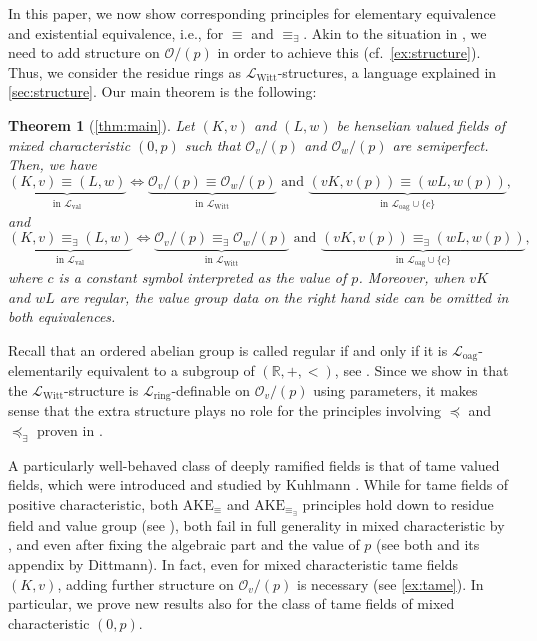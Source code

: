 \documentclass[a4paper]{amsart}
\theoremstyle{mystyle2}
\newtheorem*{thm*}{Theorem}
\theoremstyle{mystyle}
\renewcommand{\L}{\mathcal{L}}
\newcommand{\Lring}{\L_{\mathrm{ring}}}
\newcommand{\Loag}{\L_{\mathrm{oag}}}
\renewcommand{\O}{\mathcal{O}}
\numberwithin{equation}{section}
\begin{document}
    
    In this paper, we now show corresponding principles for 
    elementary equivalence and existential equivalence, i.e., for
    $\equiv$ and $\equiv_\exists$.   Akin to the situation in \cite{anscombeAxKochenErshov2024}, we need to add
    structure on $\O/(p)$ in order to achieve this (cf.~\cref{ex:structure}). Thus, we
    consider the residue rings as $\mathcal{L}_\mathrm{Witt}$-structures, a
    language explained in \cref{sec:structure}. Our main theorem is the
    following:
    \begin{thm*}[\cref{thm:main}]
        Let $(K,v)$ and $(L,w)$ be henselian valued fields of mixed characteristic 
        $(0,p)$
        such that $\O_v/(p)$ and $\O_w/(p)$ are semiperfect. Then, we have
    $$\underbrace{(K,v) \equiv (L,w)}_{\text{in }\mathcal{L}_\mathrm{val}} \Longleftrightarrow \underbrace{\mathcal{O}_v/(p) \equiv \mathcal{O}_w/(p)}_{\text{in }\mathcal{L}_{\mathrm{Witt}}}\textrm{ and } \underbrace{(vK,v(p)) 
    \equiv (wL,w(p))}_{\text{in }\mathcal{L}_{\mathrm{oag}}\cup\{c\}},$$
        and 
        $$\underbrace{(K,v) \equiv_\exists (L,w)}_{\text{in }\mathcal{L}_\mathrm{val}} \Longleftrightarrow \underbrace{\mathcal{O}_v/(p) \equiv_\exists \mathcal{O}_w/(p)}_{\text{in }\mathcal{L}_{\mathrm{Witt}}}\textrm{ and } \underbrace{(vK,v(p)) \equiv_\exists (wL,w(p))}_{\text{in }\mathcal{L}_{\mathrm{oag}}\cup\{c\}},$$
        where $c$ is a constant symbol interpreted as the value of $p$.
        Moreover, when $vK$ and $wL$ are regular, the value group data on the right hand side can be omitted in both equivalences.
    \end{thm*}
    Recall that an ordered abelian group is called regular if and only if it is
    $\Loag$-elementarily equivalent to a subgroup of $(\mathbb{R},+,<)$, see
    \cite{Rob}.
   Since we show in  that the $\mathcal{L}_\mathrm{Witt}$-structure is $\Lring$-definable on $\O_v/(p)$ using parameters, it makes sense that 
    the extra structure
    plays no role for the principles involving $\preceq$ and $\preceq_\exists$ proven
    in \cite{jahnke-kartas2023beyond}.
    
    A particularly well-behaved class of deeply ramified fields is that of tame valued
    fields, which were introduced and studied by Kuhlmann \cite{kuhlmann2016algebra}.
    While for tame fields of positive characteristic, both $\mathrm{AKE}_\equiv$ and 
    $\mathrm{AKE}_{\equiv_\exists}$ principles hold down to residue field
    and value group (see \cite[Theorem 7.1]{kuhlmann2016algebra}), both fail in full generality in mixed
    characteristic by \cite[Theorem 1.5(b)]{anscombe-kuhlmann2016notes}, and
    even after fixing the algebraic part
     and the value of $p$  (see both \cite{ketelsenCompositionAxKochenErshov2026} and its appendix by Dittmann).
    In fact, even for mixed characteristic tame fields $(K,v)$, adding 
    further structure
    on $\mathcal{O}_v/(p)$ is necessary (see \cref{ex:tame}). 
    In particular, we prove new results also for the class
    of tame fields of mixed characteristic $(0,p)$.
\end{document}
